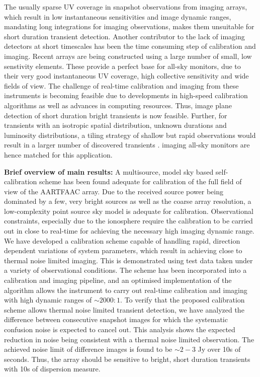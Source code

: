 \documentclass{aa}
\begin{document}
The usually  sparse UV  coverage in snapshot  observations from  imaging arrays,
which  result  in low  instantaneous  sensitivities  and  image dynamic  ranges,
mandating long integrations for  imaging observations, makes them unsuitable for
short duration transient detection.  Another  contributor to the lack of imaging
detectors at  short timescales has been  the time consuming  step of calibration
and imaging. Recent arrays are being  constructed using a large number of small,
low senstivity elements. These provide  a perfect base for all-sky monitors, due
to their  very good instantaneous  UV coverage, high collective  sensitivity and
wide fields  of view.  The challenge  of real-time calibration  and imaging from
these  instruments  is  becoming  feasible  due to  developments  in  high-speed
calibration algorithms as  well as advances in computing  resources. Thus, image
plane detection  of short duration  bright transients is now  feasible. Further,
for  transients with an  isotropic spatial  distribution, unknown  durations and
luminosity distributions,  a tiling strategy  of shallow but  rapid observations
would    result    in    a    larger    number    of    discovered    transients
\citep {nemiroff2003tile}.  imaging  all-sky monitors are hence  matched for this
application.

\textbf{Brief  overview  of  main  results:}  A  multisource,  model  sky  based
self-calibration  scheme has  been found  adequate for  calibration of  the full
field of  view of the  AARTFAAC array.  Due  to the received source  power being
dominated by a few, very bright  sources as well as the coarse array resolution,
a  low-complexity   point  source  sky   model  is  adequate   for  calibration.
Observational  constraints,  especially  due   to  the  ionosphere  require  the
calibration to be carried out in  close to real-time for achieving the necessary
high imaging dynamic  range.  We have developed a  calibration scheme capable of
handling  rapid,  direction dependent  variations  of  system parameters,  which
result in achieving close to thermal noise limited imaging. This is demonstrated
using test data  taken under a variety of  observational conditions.  The scheme
has been incorporated into a  calibration and imaging pipeline, and an optimised
implementation of  the algorithm  allows the instrument  to carry  out real-time
calibration  and  imaging  with   high  dynamic  ranges  of  $\sim2000:1$.  To verify that the proposed calibration scheme allows thermal noise limited transient detection, we have analyzed the difference between consecutive snapshot images for which the systematic confusion noise is expected to cancel out. This analysis shows the expected reduction in noise being consistent with a thermal noise limited observation. The achieved noise limit of difference images is found to be $\sim2-3$
Jy over  10s of seconds.  Thus, the  array should be sensitive  to bright, short
duration transients with 10s of dispersion measure.
 
\end{document}
